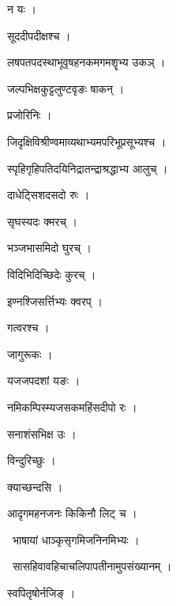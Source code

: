 \documentclass[10pt, openany, oneside]{book}
\begin{document}
\noindent न यः ।

\noindent सूददीपदीक्षश्च ।

\noindent लषपतपदस्थाभूवृषहनकमगमशॄभ्य उकञ् ।

\noindent जल्पभिक्षकुट्टलुण्टवृङः षाकन् ।

\noindent प्रजोरिनिः ।

\noindent जिदृक्षिविश्रीण्वमाव्यथाभ्यमपरिभूप्रसूभ्यश्च ।

\noindent स्पृहिगृहिपतिदयिनिद्रातन्द्राश्रद्धाभ्य आलुच् ।

\noindent दाधेट्सिशदसदो रुः ।

\noindent सृघस्यदः क्मरच् ।

\noindent भञ्जभासमिदो घुरच् ।

\noindent विदिभिदिच्छिदेः कुरच् ।

\noindent इण्नश्जिसर्त्तिभ्यः क्वरप् ।

\noindent गत्वरश्च ।

\noindent जागुरूकः ।

\noindent यजजपदशां यङः ।

\noindent नमिकम्पिस्म्यजसकमहिंसदीपो रः ।

\noindent सनाशंसभिक्ष उः ।

\noindent विन्दुरिच्छुः ।

\noindent क्याच्छन्दसि ।

\noindent आदृगमहनजनः किकिनौ लिट् च ।

\par\noindent\hspace{1.5em}{\vps वा॰}~{\qt भाषायां धाञ्कृसृगमिजनिनमिभ्यः ।}

\par\noindent\hspace{1.5em}{\vps वा॰}~{\qt सासहिवावहिचाचलिपापतीनामुपसंख्यानम् ।}

\noindent स्वपितृषोर्नजिङ् ।
\end{document}
